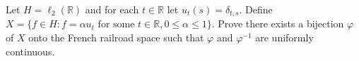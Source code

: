 Let $H = \ell_2(\mathbb{R})$ and for each $t \in \mathbb{R}$ let $u_t(s) = \delta_{t,s}$. Define $X = \{f \in H : f = \alpha u_t \text{ for some } t \in \mathbb{R}, 0 \leq \alpha \leq 1\}$. Prove there exists a bijection $\varphi$ of $X$ onto the French railroad space such that $\varphi$ and $\varphi^{-1}$ are uniformly continuous.

